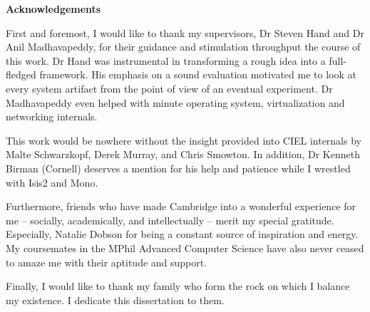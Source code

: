 \newpage
{\Huge \bf Acknowledgements}

\vspace{24pt} 
First and foremost, I would like to thank my supervisors, Dr Steven Hand and Dr
Anil Madhavapeddy, for their guidance and stimulation throughput the course of
this work. Dr Hand was instrumental in transforming a rough idea into a
full-fledged framework. His emphasis on a sound evaluation motivated me to look
at every system artifact from the point of view of an eventual experiment. Dr
Madhavapeddy even helped with minute operating system, virtualization and
networking internals.

This work would be nowhere without the insight provided into CIEL internals by
Malte Schwarzkopf, Derek Murray, and Chris Smowton. In addition, Dr Kenneth
Birman (Cornell) deserves a mention for his help and patience while I wrestled
with Isis2 and Mono.

Furthermore, friends who have made Cambridge into a wonderful experience for me
-- socially, academically, and intellectually -- merit my special gratitude.
Especially, Natalie Dobson for being a constant source of inspiration and
energy. My coursemates in the MPhil Advanced Computer Science have also never
ceased to amaze me with their aptitude and support.

Finally, I would like to thank my family who form the rock on which I balance my
existence. I dedicate this dissertation to them.

\vfill

\newpage
\vspace*{\fill}
